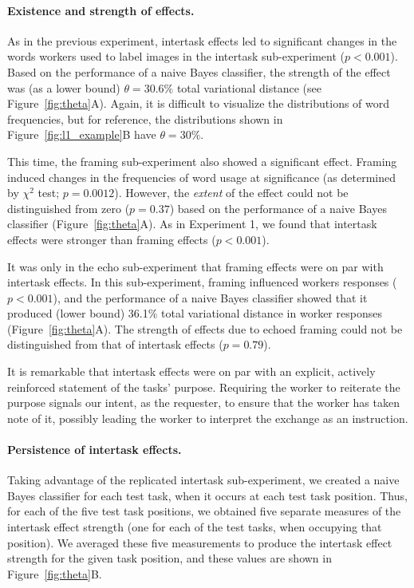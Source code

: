 \documentclass{sigchi}
\begin{document}
\paragraph{Existence and strength of effects.}
As in the previous experiment, intertask effects led to significant 
changes in the words workers used to label images in the intertask 
sub-experiment ($p<0.001$).  Based on
the performance of a naive Bayes classifier, the strength of the effect 
was (as a lower bound) $\theta=30.6\%$ total variational distance
(see Figure~\ref{fig:theta}A).  Again, it is difficult to visualize the 
distributions of word frequencies, but for reference, the distributions 
shown in Figure~\ref{fig:l1_example}B have $\theta = 30\%$.  

This time, the framing sub-experiment also showed a significant effect.
Framing induced changes in the frequencies of word usage at significance 
(as determined by $\chi^2$ test; $p=0.0012$).  However, 
the \textit{extent} of the effect could not be distinguished from zero
($p =0.37$) based on the performance of a naive Bayes classifier 
(Figure~\ref{fig:theta}A).
As in Experiment 1, we found that intertask effects were stronger than
framing effects ($p<0.001$).

It was only in the echo sub-experiment that framing effects were on par 
with intertask effects.  In this sub-experiment, framing influenced 
workers responses ($p<0.001$), and the performance of a naive 
Bayes classifier showed that it produced (lower bound) 36.1\% total 
variational distance in worker responses (Figure~\ref{fig:theta}A).  The
strength of effects due to echoed framing could not be distinguished
from that of intertask effects ($p=0.79$).

It is remarkable that intertask effects were on par with an explicit, 
actively reinforced statement of the tasks' purpose.
Requiring the worker to reiterate the purpose signals our intent, as the 
requester, to ensure that the worker has taken note of it, 
possibly leading the worker to interpret the exchange as an instruction.  

\paragraph{Persistence of intertask effects.} 
Taking advantage of the replicated intertask sub-experiment, we created
a naive Bayes classifier for each test task, when it occurs at each test 
task position.  
Thus, for each of the five test task positions, we obtained 
five separate measures of the intertask effect strength (one for each of 
the test tasks, when occupying that position).  We averaged these five 
measurements to produce the intertask effect strength for the given task
position, and these values are shown in Figure~\ref{fig:theta}B.
\end{document}
